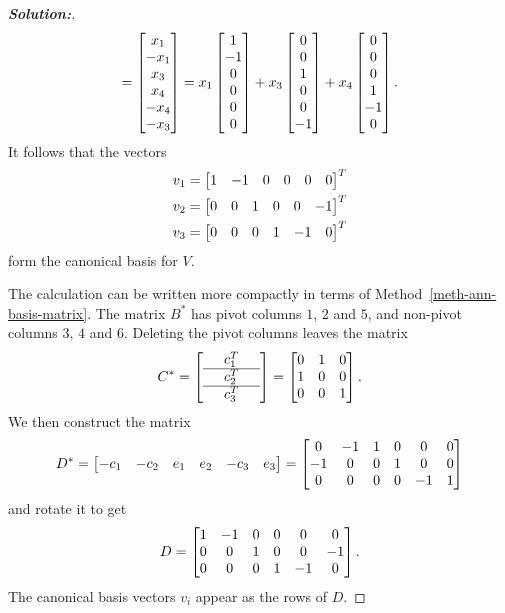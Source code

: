 \documentclass[a4paper]{amsart}
\theoremstyle{definition}
\newenvironment{solution}{\begin{proof}[\textbf{Solution:}] \vphantom{u}}{\end{proof}}
\begin{document}
\begin{solution}
\[      = \left[\begin{matrix} x_1\\ -x_1 \\ x_3 \\ x_4 \\ -x_4 \\ -x_3 \end{matrix}\right]
      = x_1 \left[\begin{matrix} 1 \\ -1 \\ 0 \\ 0 \\  0 \\  0 \end{matrix}\right] + 
        x_3 \left[\begin{matrix} 0 \\  0 \\ 1 \\ 0 \\  0 \\ -1 \end{matrix}\right] + 
        x_4 \left[\begin{matrix} 0 \\  0 \\ 0 \\ 1 \\ -1 \\  0 \end{matrix}\right]. 
 \]
 It follows that the vectors 
 \begin{align*}
  v_1 &= \left[\begin{matrix} 1 & -1 & 0 & 0 &  0 &  0 \end{matrix}\right]^T \\
  v_2 &= \left[\begin{matrix} 0 &  0 & 1 & 0 &  0 & -1 \end{matrix}\right]^T \\
  v_3 &= \left[\begin{matrix} 0 &  0 & 0 & 1 & -1 &  0 \end{matrix}\right]^T 
 \end{align*}
 form the canonical basis for $V$.

 The calculation can be written more compactly in terms of
 Method~\ref{meth-ann-basis-matrix}.  The matrix $B^*$ has pivot 
 columns $1$, $2$ and $5$, and non-pivot columns $3$, $4$ and $6$.
 Deleting the pivot columns leaves the matrix
 \[ C^* =
    \left[\begin{array}{ccc}
     & c_1^T & \\ \hline
     & c_2^T & \\ \hline
     & c_3^T & 
    \end{array}\right]
    =
    \left[\begin{matrix} 0&1&0 \\ 1&0&0 \\ 0&0&1 \end{matrix}\right].
 \]
 We then construct the matrix
 \[ D^* = \left[\begin{matrix} -c_1 & -c_2 & e_1 & e_2 & -c_3 & e_3 \end{matrix}\right] 
     = \left[\begin{matrix} 
         0 & -1 &  1 &  0 &  0 &  0 \\
        -1 &  0 &  0 &  1 &  0 &  0 \\
         0 &  0 &  0 &  0 & -1 &  1
       \end{matrix}\right] 
 \]
 and rotate it to get 
 \[ D = 
     \left[\begin{matrix}
      1 & -1 & 0 & 0 & 0 & 0 \\
      0 & 0 & 1 & 0 & 0 & -1 \\
      0 & 0 & 0 & 1 & -1 & 0
     \end{matrix}\right].
 \]
 The canonical basis vectors $v_i$ appear as the rows of $D$.
\end{solution}
\end{document}
